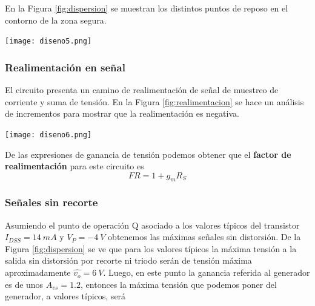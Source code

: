 \begin{multicols}{2}
\begin{itemize}
        	\end{itemize}


        En la Figura \ref{fig:dispersion} se muestran los distintos puntos de reposo en el contorno de la zona segura.

        \begin{center}
                   \texttt{[image: diseno5.png]}
                   \label{fig:dispersion}
        \end{center}


        \subsubsection{Realimentación en señal}

        El circuito presenta un camino de realimentación de señal de muestreo de corriente y suma de tensión. En la Figura \ref{fig:realimentacion} se hace un análisis de incrementos para mostrar que la realimentación es negativa.


        \begin{center}
                   \texttt{[image: diseno6.png]}
                   \label{fig:realimentacion}
        \end{center}


        De las expresiones de ganancia de tensión podemos obtener que el \textbf{factor de realimentación} para este circuito es
        \begin{equation}
        	FR = 1+g_mR_S
        	\end{equation}

        \subsubsection{Señales sin recorte}

        Asumiendo el punto de operación Q asociado a los valores típicos del transistor $I_{DSS} = 14\ mA$ y $V_P = -4\ V$ obtenemos las máximas señales sin distorsión. De la Figura \ref{fig:dispersion} se ve que para los valores típicos la máxima tensión a la salida sin distorsión por recorte ni triodo serán de tensión máxima aproximadamente $\hat{v_o} = 6\ V$. Luego, en este punto la ganancia referida al generador es de unos $A_{vs} = 1.2$, entonces la máxima tensión que podemos poner del generador, a valores típicos, será


\end{multicols}
